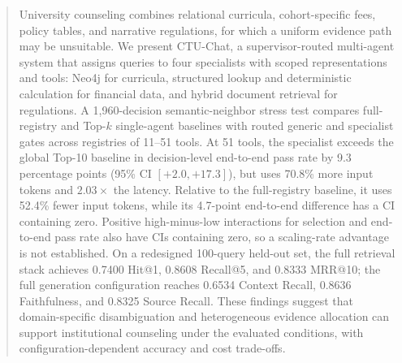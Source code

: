 \begin{abstract}
University counseling combines relational curricula, cohort-specific fees, policy tables, and narrative regulations, for which a uniform evidence path may be unsuitable. We present CTU-Chat, a supervisor-routed multi-agent system that assigns queries to four specialists with scoped representations and tools: Neo4j for curricula, structured lookup and deterministic calculation for financial data, and hybrid document retrieval for regulations. A 1,960-decision semantic-neighbor stress test compares full-registry and Top-$k$ single-agent baselines with routed generic and specialist gates across registries of 11--51 tools. At 51 tools, the specialist exceeds the global Top-10 baseline in decision-level end-to-end pass rate by 9.3 percentage points (95\% CI $[+2.0,+17.3]$), but uses 70.8\% more input tokens and $2.03\times$ the latency. Relative to the full-registry baseline, it uses 52.4\% fewer input tokens, while its 4.7-point end-to-end difference has a CI containing zero. Positive high-minus-low interactions for selection and end-to-end pass rate also have CIs containing zero, so a scaling-rate advantage is not established. On a redesigned 100-query held-out set, the full retrieval stack achieves 0.7400 Hit@1, 0.8608 Recall@5, and 0.8333 MRR@10; the full generation configuration reaches 0.6534 Context Recall, 0.8636 Faithfulness, and 0.8325 Source Recall. These findings suggest that domain-specific disambiguation and heterogeneous evidence allocation can support institutional counseling under the evaluated conditions, with configuration-dependent accuracy and cost trade-offs.

\end{abstract}
